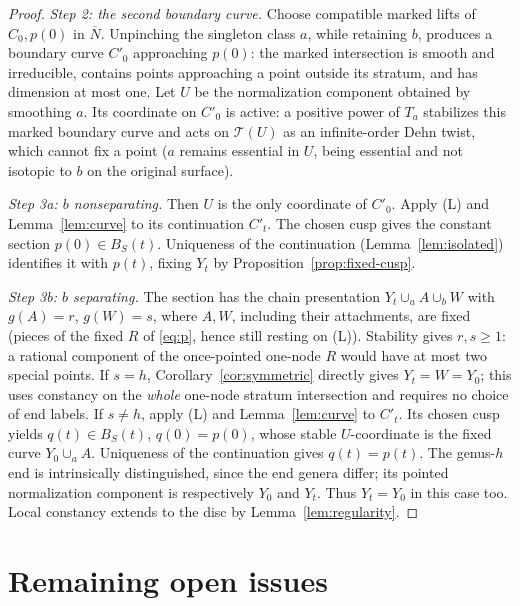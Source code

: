 \documentclass[12pt]{article}
\newcommand{\T}{\mathcal T}
\newcommand{\cl}[1]{\overline{#1}}
\theoremstyle{remark}
\begin{document}
\begin{proof}
\emph{Step 2: the second boundary curve.}
Choose compatible marked lifts of \(C_0,p(0)\) in \(\cl N\).
Unpinching the singleton class \(a\), while retaining \(b\),
produces a boundary curve \(C'_0\) approaching \(p(0)\):
the marked intersection is smooth and irreducible,
contains points approaching a point outside its stratum,
and has dimension at most one. Let \(U\) be the normalization
component obtained by smoothing \(a\). Its coordinate on
\(C'_0\) is active: a positive power of \(T_a\) stabilizes
this marked boundary curve and acts on \(\T(U)\) as an
infinite-order Dehn twist, which cannot fix a point
(\(a\) remains essential in \(U\), being essential and
not isotopic to \(b\) on the original surface).

\emph{Step 3a: \(b\) nonseparating.}
Then \(U\) is the only coordinate of \(C'_0\). Apply (L) and
Lemma~\ref{lem:curve} to its continuation \(C'_t\). The chosen
cusp gives the constant section \(p(0)\in B_S(t)\). Uniqueness of
the continuation (Lemma~\ref{lem:isolated}) identifies it with
\(p(t)\), fixing \(Y_t\) by Proposition~\ref{prop:fixed-cusp}.

\emph{Step 3b: \(b\) separating.}
The section has the chain presentation
\(Y_t\cup_a A\cup_b W\) with \(g(A)=r\), \(g(W)=s\),
where \(A,W\), including their attachments, are fixed (pieces of
the fixed \(R\) of \eqref{eq:p}, hence still resting on (L)).
Stability gives \(r,s\ge1\): a rational component of the
once-pointed one-node \(R\) would have at most two special
points. If \(s=h\), Corollary~\ref{cor:symmetric} directly
gives \(Y_t=W=Y_0\); this uses constancy on the \emph{whole}
one-node stratum intersection and requires no choice of
end labels. If \(s\ne h\), apply (L) and Lemma~\ref{lem:curve} to
\(C'_t\). Its chosen cusp yields \(q(t)\in B_S(t)\), \(q(0)=p(0)\),
whose stable \(U\)-coordinate is the fixed curve \(Y_0\cup_a A\).
Uniqueness of the continuation gives \(q(t)=p(t)\). The genus-\(h\) end
is intrinsically distinguished, since the end genera differ;
its pointed normalization component is respectively \(Y_0\)
and \(Y_t\). Thus \(Y_t=Y_0\) in this case too.
Local constancy extends to the disc by Lemma~\ref{lem:regularity}.
\end{proof}

\section{Remaining open issues}\label{sec:open}
\end{document}
